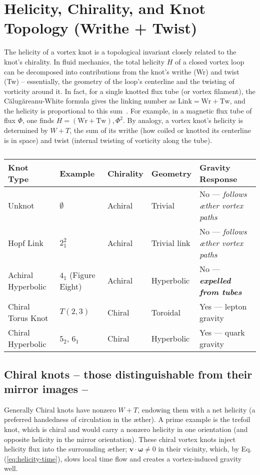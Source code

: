 \usepackage[utf8]{inputenc}
\usepackage[T1]{fontenc}
\section*{Helicity, Chirality, and Knot Topology (Writhe + Twist)}

The helicity of a vortex knot is a topological invariant closely related to the knot's chirality. In fluid mechanics, the total helicity $H$ of a closed vortex loop can be decomposed into contributions from the knot's writhe (Wr) and twist (Tw) -- essentially, the geometry of the loop's centerline and the twisting of vorticity around it. In fact, for a single knotted flux tube (or vortex filament), the Călugăreanu-White formula gives the linking number as $\text{Link} = \text{Wr} + \text{Tw}$, and the helicity is proportional to this sum~\cite{knot_theroy_in_fluid}. For example, in a magnetic flux tube of flux $\Phi$, one finds $H = (\text{Wr} + \text{Tw}),\Phi^2$\cite{knot_theroy_in_fluid}. By analogy, a vortex knot's helicity is determined by $W+T$, the sum of its writhe (how coiled or knotted its centerline is in space) and twist (internal twisting of vorticity along the tube)\cite{knot_theroy_in_fluid}.

\begin{table}[H]
    \centering
    \begin{tabular}{lllll}
        \toprule
        \textbf{Knot Type} & \textbf{Example} & \textbf{Chirality} & \textbf{Geometry} & \textbf{Gravity Response} \\
        \midrule
        Unknot & $\emptyset$ & Achiral & Trivial & No — \textit{follows æther vortex paths} \\
        Hopf Link & $2_1^2$ & Achiral & Trivial link & No — \textit{follows æther vortex paths} \\
        Achiral Hyperbolic & $4_1$ (Figure Eight) & Achiral & Hyperbolic & No — \textit{\textbf{expelled from tubes}} \\
        Chiral Torus Knot & $T(2,3)$ & Chiral & Toroidal & Yes — lepton gravity \\
        Chiral Hyperbolic & $5_2$, $6_1$ & Chiral & Hyperbolic & Yes — quark gravity \\
        \bottomrule
    \end{tabular}
    \caption{}
    \label{tab:knot_classification}
\end{table}


\subsection*{Chiral knots -- those distinguishable from their mirror images -- }
Generally Chiral knots have nonzero $W+T$, endowing them with a net helicity (a preferred handedness of circulation in the \ae ther). A prime example is the trefoil knot, which is chiral and would carry a nonzero helicity in one orientation (and opposite helicity in the mirror orientation). These chiral vortex knots inject helicity flux into the surrounding \ae ther; $\mathbf{v}\cdot\boldsymbol{\omega}\neq 0$ in their vicinity, which, by Eq.(\ref{eq:helicity-time}), slows local time flow and creates a vortex-induced gravity well.


